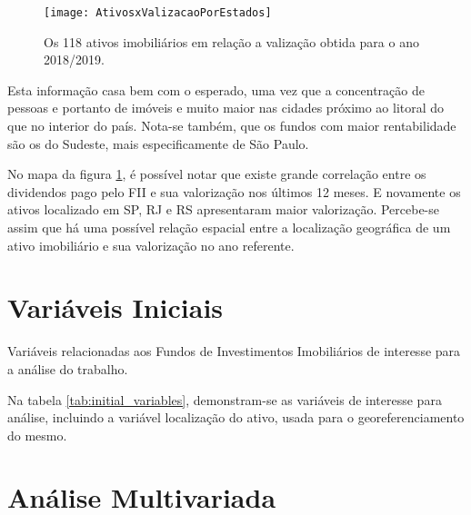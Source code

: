\begin{center}
\begin{figure}
\begin{centering}
\texttt{[image: AtivosxValizacaoPorEstados]}
\end{centering}
\caption{\label{fig:papers_vs_valization}Os 118 ativos imobiliários em relação a valização obtida para o ano 2018/2019.}
\end{figure}
\vspace*{-44pt}
\end{center}

Esta informação casa bem com o esperado, uma vez que a concentração de pessoas e portanto de imóveis e muito maior nas cidades próximo ao litoral do que no interior do país. Nota-se também, que os fundos com maior rentabilidade são os do Sudeste, mais especificamente de São Paulo. %

No mapa da figura \ref{fig:papers_vs_valization}, é possível notar que existe grande correlação entre os dividendos pago pelo FII e sua valorização nos últimos 12 meses. E novamente os ativos localizado em SP, RJ e RS apresentaram maior valorização. Percebe-se assim que há uma possível relação espacial entre a localização geográfica de um ativo imobiliário e sua valorização no ano referente.

\section{Variáveis Iniciais}
\label{sec:initial_variables}
\begin{table}[h]

\begin{centering}
\caption{\label{tab:initial_variables} Variáveis relacionadas aos Fundos de Investimentos Imobiliários de interesse para a análise do trabalho.}
\end{centering}
\end{table}

Na tabela \ref{tab:initial_variables}, demonstram-se as variáveis de interesse para análise, incluindo a variável localização do ativo, usada para o georeferenciamento do mesmo.

\section{Análise Multivariada}
\label{sec:multivariate_analysis}

